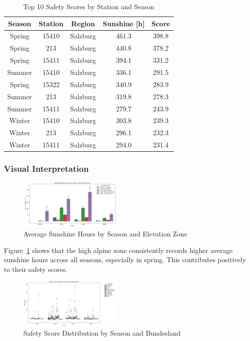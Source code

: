 \begin{table}[H]
\centering
\begin{tabular}{|c|c|c|c|c|}
\hline
\textbf{Season} & \textbf{Station} & \textbf{Region} & \textbf{Sunshine [h]} & \textbf{Score} \\
\hline
Spring & 15410 & Salzburg & 461.3 & 398.8 \\
Spring & 213   & Salzburg & 440.8 & 378.2 \\
Spring & 15411 & Salzburg & 394.1 & 331.2 \\
Summer & 15410 & Salzburg & 336.1 & 291.5 \\
Spring & 15322 & Salzburg & 340.9 & 283.9 \\
Summer & 213   & Salzburg & 319.8 & 278.3 \\
Summer & 15411 & Salzburg & 279.7 & 243.9 \\
Winter & 15410 & Salzburg & 303.8 & 239.3 \\
Winter & 213   & Salzburg & 296.1 & 232.3 \\
Winter & 15411 & Salzburg & 294.0 & 231.4 \\
\hline
\end{tabular}
\caption{Top 10 Safety Scores by Station and Season}
\label{tab:top_scores}
\end{table}

\subsubsection{Visual Interpretation}

\begin{figure}[H]
    \centering
    \includegraphics[width=0.45\textwidth]{img/sunshine_by_season_zone.png}
    \caption{Average Sunshine Hours by Season and Elevation Zone}
    \label{fig:sunshine}
\end{figure}

Figure~\ref{fig:sunshine} shows that the high alpine zone consistently records higher average sunshine hours across all seasons, especially in spring. This contributes positively to their safety scores.

\begin{figure}[H]
    \centering
    \includegraphics[width=0.45\textwidth]{img/safety_score_boxplot.png}
    \caption{Safety Score Distribution by Season and Bundesland}
    \label{fig:safety_boxplot}
\end{figure}

